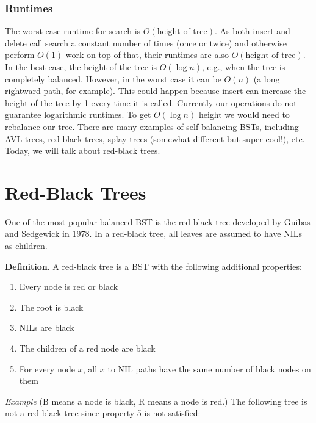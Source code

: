 \documentclass [12pt]{article}
\begin{document}
\subsubsection{Runtimes} 
The worst-case runtime for search is $O(\text{height of tree})$. As both insert and delete call search a constant number of times (once or twice) and otherwise perform $O(1)$ work on top of that, their runtimes are also $O(\text{height of tree})$. In the best case, the height of the tree is $O(\log n)$, e.g., when the tree is completely balanced. However, in the worst case it can be $O(n)$ (a long rightward path, for example). This could happen because insert can increase the height of the tree by 1 every time it is called. Currently our operations do not guarantee logarithmic runtimes. To get $O(\log n)$ height we would need to rebalance our tree. There are many examples of self-balancing BSTs, including AVL trees, red-black trees, splay trees (somewhat different but super cool!), etc. Today, we will talk about red-black trees.

\section{Red-Black Trees}
One of the most popular balanced BST is the red-black tree developed by Guibas and Sedgewick in 1978. In a red-black tree, all leaves are assumed to have NILs as children.

\textbf{Definition}. A red-black tree is a BST with the following additional properties:

\begin{enumerate}
  \item Every node is red or black
  \item The root is black
  \item NILs are black
  \item The children of a red node are black
  \item For every node $x$, all $x$ to NIL paths have the same number of black nodes on them
\end{enumerate}

\textit{Example}  (B means a node is black, R means a node is red.) The following tree is not a red-black tree since property 5 is not satisfied:

\begin{center}
\end{center}
\end{document}
